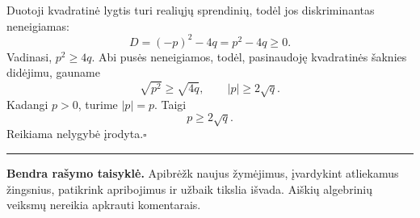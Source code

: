 \documentclass[11pt,a4paper]{article}
\newcommand{\qed}{\hfill$\square$}
\begin{document}
Duotoji kvadratinė lygtis turi realiųjų sprendinių, todėl jos diskriminantas neneigiamas:
\[
D=(-p)^2-4q=p^2-4q\ge0.
\]
Vadinasi, $p^2\ge4q$. Abi pusės neneigiamos, todėl, pasinaudoję kvadratinės šaknies didėjimu, gauname
\[
\sqrt{p^2}\ge\sqrt{4q},\qquad |p|\ge2\sqrt q.
\]
Kadangi $p>0$, turime $|p|=p$. Taigi
\[
\boxed{p\ge2\sqrt q.}
\]
Reikiama nelygybė įrodyta.\qed

\vfill
\hrule
\medskip
\textbf{Bendra rašymo taisyklė.} Apibrėžk naujus žymėjimus, įvardykint atliekamus žingsnius, patikrink apribojimus ir užbaik tikslia išvada. Aiškių algebrinių veiksmų nereikia apkrauti komentarais.
\end{document}
